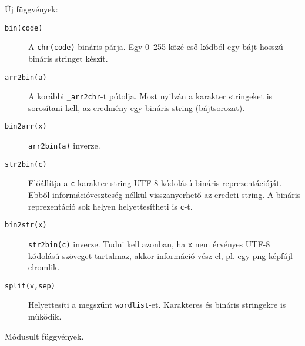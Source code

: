 Új függvények:
\begin{description}
\item[{\tt bin(code)}]
    A \verb!chr(code)! bináris párja. Egy 0--255 közé eső
    kódból egy bájt hosszú bináris stringet készít.
\item[{\tt arr2bin(a)}]
    A korábbi \verb!_arr2chr!-t pótolja. Most nyilván a karakter
    stringeket is sorosítani kell, az eredmény egy bináris string
    (bájtsorozat).
\item[{\tt bin2arr(x)}]
    \verb!arr2bin(a)! inverze.
\item[{\tt str2bin(c)}]
    Előállítja a \verb!c! karakter string UTF-8 kódolású bináris
    reprezentációját. Ebből információveszteség nélkül visszanyerhető
    az eredeti string. A bináris reprezentáció sok helyen helyettesítheti
    is \verb!c!-t.
\item[{\tt bin2str(x)}]
    \verb!str2bin(c)! inverze. Tudni kell azonban,  ha \verb!x!
    nem érvényes UTF-8 kódolású szöveget tartalmaz, akkor információ
    vész el, pl. egy png képfájl elromlik.
\item[{\tt split(v,sep)}]
    Helyettesíti a megszűnt \verb!wordlist!-et.
    Karakteres és bináris stringekre is működik.
\end{description}

Módusult függvények.

